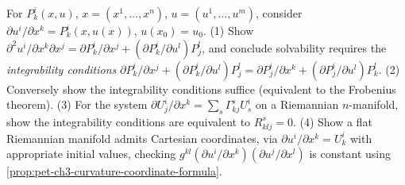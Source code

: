 \begin{remark}
  \label{rem:pet-ch3-ex-20}
  \leanok
  For $P^i_k(x,u)$, $x=(x^1,\dots,x^n)$, $u=(u^1,\dots,u^m)$, consider
  $\partial u^i/\partial x^k=P^i_k(x,u(x))$, $u(x_0)=u_0$. (1) Show
  $\partial^2u^i/\partial x^k\partial x^j=\partial P^i_k/\partial
  x^j+(\partial P^i_k/\partial u^l)P^l_j$, and conclude solvability requires the
  \emph{integrability conditions}
  $\partial P^i_k/\partial x^j+(\partial P^i_k/\partial u^l)P^l_j=\partial
  P^i_j/\partial x^k+(\partial P^i_j/\partial u^l)P^l_k$. (2) Conversely show
  the integrability conditions suffice (equivalent to the Frobenius theorem). (3)
  For the system $\partial U^i_j/\partial x^k=\sum_s\Gamma^s_{kj}U^i_s$ on a
  Riemannian $n$-manifold, show the integrability conditions are equivalent to
  $R^s_{klj}=0$. (4) Show a flat Riemannian manifold admits Cartesian
  coordinates, via $\partial u^i/\partial x^k=U^i_k$ with appropriate initial
  values, checking $g^{kl}(\partial u^i/\partial x^k)(\partial u^j/\partial x^l)$
  is constant using \cref{prop:pet-ch3-curvature-coordinate-formula}.
\end{remark}


